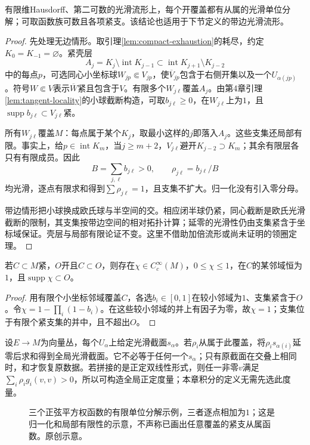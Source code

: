 \begin{theorem}[光滑单位分解]\label{thm:partition-unity}
有限维Hausdorff、第二可数的光滑流形上，每个开覆盖都有从属的光滑单位分解；可取函数族可数且各项紧支。该结论也适用于下节定义的带边光滑流形。
\end{theorem}
\begin{proof}
先处理无边情形。取引理\ref{lem:compact-exhaustion}的耗尽，约定$K_0=K_{-1}=\varnothing$。紧壳层
\[
 A_j=K_j\setminus\operatorname{int}K_{j-1}
 \subset\operatorname{int}K_{j+1}\setminus K_{j-2}
\]
中的每点$p$，可选同心小坐标球$W_{jp}\Subset V_{jp}$，使$\overline V_{jp}$包含于右侧开集以及一个$U_{\alpha(jp)}$。符号$W\Subset V$表示$\overline W$紧且包含于$V$。有限多个$W_{j\ell}$覆盖$A_j$。由第4章引理\ref{lem:tangent-locality}的小球截断构造，可取$b_{j\ell}\geq0$，在$W_{j\ell}$上为$1$，且$\operatorname{supp}b_{j\ell}\subset V_{j\ell}$紧。

所有$W_{j\ell}$覆盖$M$：每点属于某个$K_j$，取最小这样的$j$即落入$A_j$。这些支集还局部有限。事实上，给$p\in\operatorname{int}K_m$，当$j\geq m+2$，$V_{j\ell}$避开$K_{j-2}\supset K_m$；其余有限层各只有有限成员。因此
\[
 B=\sum_{j,\ell}b_{j\ell}>0,\qquad
 \rho_{j\ell}=b_{j\ell}/B
\]
均光滑，逐点有限求和得到$\sum\rho_{j\ell}=1$，且支集不扩大。归一化没有引入零分母。

带边情形把小球换成欧氏球与半空间的交。相应闭半球仍紧，同心截断是欧氏光滑截断的限制，其支集按带边空间的相对拓扑计算；延零的光滑性仍由支集紧含于坐标域保证。壳层与局部有限论证不变。这里不借助加倍流形或尚未证明的领圈定理。
\end{proof}

\begin{corollary}[紧集附近的截断]\label{cor:compact-cutoff}
若$C\subset M$紧，$O$开且$C\subset O$，则存在$\chi\in C_c^\infty(M)$，$0\leq\chi\leq1$，在$C$的某邻域恒为$1$，且$\operatorname{supp}\chi\subset O$。
\end{corollary}
\begin{proof}
用有限个小坐标邻域覆盖$C$，各选$b_i\in[0,1]$在较小邻域为$1$、支集紧含于$O$。令$\chi=1-\prod_i(1-b_i)$。在这些较小邻域的并上有因子为零，故$\chi=1$；支集位于有限个紧支集的并中，且不超出$O$。
\end{proof}

\begin{example}[把局部截面拼成全局截面]
设$E\to M$为向量丛，每个$U_\alpha$上给定光滑截面$s_\alpha$。若$\rho_i$从属于此覆盖，将$\rho_i s_{\alpha(i)}$延零后求和得到全局光滑截面。它不必等于任何一个$s_\alpha$；只有原截面在交叠上相同时，和才恢复原数据。若拼接的是正定双线性形式，则任一非零$v$满足$\sum_i\rho_i g_i(v,v)>0$，所以可构造全局正定度量；本章积分的定义无需先选此度量。
\end{example}
\begin{figure}[htbp]
\centering
\caption{三个正弦平方权函数的有限单位分解示例，三者逐点相加为$1$；这是归一化和局部有限性的示意，不声称已画出任意覆盖的紧支从属函数。原创示意。}
\label{fig:partition-unity}
\end{figure}
